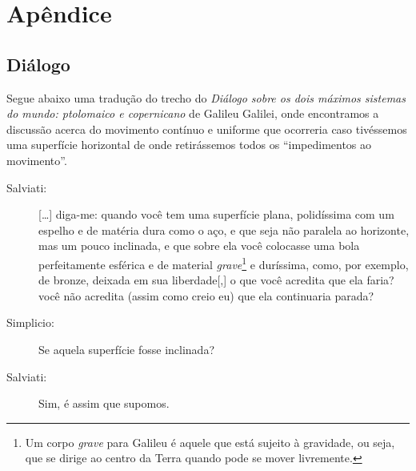 \section{Apêndice}

\subsection{Diálogo}

Segue abaixo uma tradução do trecho do \emph{Diálogo sobre os dois máximos sistemas do mundo: ptolomaico e copernicano} de Galileu Galilei, onde encontramos a discussão acerca do movimento contínuo e uniforme que ocorreria caso tivéssemos uma superfície horizontal de onde retirássemos todos os ``impedimentos ao movimento''.
\begin{description}
\item[Salviati:] [\dots] diga-me: quando você tem uma superfície plana, polidíssima com um espelho e de matéria dura como o aço, e que seja não paralela ao horizonte, mas um pouco inclinada, e que sobre ela você colocasse uma bola perfeitamente esférica e de material \emph{grave}\footnote{Um corpo \emph{grave} para Galileu é aquele que está sujeito à gravidade, ou seja, que se dirige ao centro da Terra quando pode se mover livremente.} e duríssima, como, por exemplo, de bronze, deixada em sua liberdade[,] o que você acredita que  ela faria? você não acredita (assim como creio eu) que ela continuaria parada?

\item[Simplicio:] Se aquela superfície fosse inclinada?

\item[Salviati:] Sim, é assim que supomos.


\end{description}
